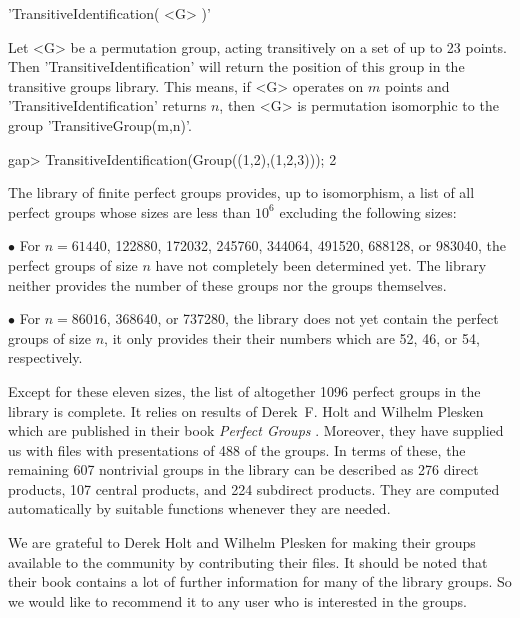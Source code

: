 \>'TransitiveIdentification( <G> )'

Let <G> be a permutation group, acting transitively on a set  of up to 23
points.  Then 'TransitiveIdentification' will return the position of this
group in the transitive  groups library.  This means,  if <G> operates on
$m$ points and    'TransitiveIdentification'  returns $n$,  then <G>   is
permutation isomorphic to the group 'TransitiveGroup(m,n)'.

\beginexample
gap> TransitiveIdentification(Group((1,2),(1,2,3)));
2
\endexample

%

The {\GAP} library of finite  perfect groups provides, up to isomorphism,
a list of all perfect groups whose sizes are less than  $10^6$  excluding
the following sizes:
{\parindent\manindent
\item{$\bullet$}
      For $n = 61440$, 122880, 172032, 245760, 344064, 491520, 688128, or
      983040,  the perfect groups  of size  $n$  have not completely been
      determined yet.  The library  neither provides  the number of these
      groups nor the groups themselves.
\item{$\bullet$}
      For  $n = 86016$,  368640,  or  737280,  the library  does not  yet
      contain  the perfect groups  of size  $n$,  it  only provides their
      their numbers which are 52, 46, or 54, respectively.
\par}

Except for these eleven sizes, the list of altogether 1096 perfect groups
in the library is  complete.  It relies  on results of Derek~F. Holt  and
Wilhelm  Plesken which are published  in  their book {\it Perfect Groups}
\cite{HP89}.  Moreover, they have supplied us with files with presentations
of  488 of the groups.  In terms of  these, the  remaining 607 nontrivial
groups in  the  library can  be   described as 276 direct   products, 107
central  products, and  224  subdirect    products.  They are    computed
automatically by suitable {\GAP} functions whenever they are needed.

We are grateful to Derek Holt and Wilhelm Plesken for making their groups
available to the {\GAP} community  by contributing their files. It should
be noted that  their book contains a  lot of further information for many
of the library groups.  So we would like  to recommend  it to any  {\GAP}
user who is interested in the groups.


